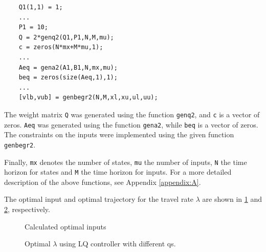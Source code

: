 \begin{lstlisting}
    Q1(1,1) = 1;
    ...
    P1 = 10;
    Q = 2*genq2(Q1,P1,N,M,mu);
    c = zeros(N*mx+M*mu,1);
    ...
    Aeq = gena2(A1,B1,N,mx,mu);
    beq = zeros(size(Aeq,1),1);
    ...
    [vlb,vub] = genbegr2(N,M,xl,xu,ul,uu);
\end{lstlisting}
The weight matrix \texttt{Q} was generated using the function \texttt{genq2}, and \texttt{c} is a vector of zeros. \texttt{Aeq} was generated using the function \texttt{gena2}, while \texttt{beq} is a vector of zeros. The constraints on the inputs were implemented using the given function \texttt{genbegr2}.

Finally, \texttt{mx} denotes the number of states, \texttt{mu} the number of inputs, \texttt{N} the time horizon for states and \texttt{M} the time horizon for inputs. For a more detailed description of the above functions, see Appendix \ref{appendix:A}.

The optimal input and optimal trajectory for the travel rate $\lambda$ are shown in \cref{fig:optimal_inputs} and \cref{fig:optimal_lambda}, respectively.

\begin{figure}[h]
    \centering
    \caption{Calculated optimal inputs}
    \label{fig:optimal_inputs}
\end{figure}

\begin{figure}[H]
    \centering
    \caption{Optimal $\lambda$ using LQ controller with different qs.}
    \label{fig:optimal_lambda}
\end{figure}

